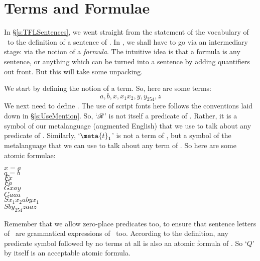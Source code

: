 \section{Terms and Formulae}\label{s:termsandf}
In §\ref{s:TFLSentences}, we went straight from the statement of the vocabulary of \TFL\ to the definition of a sentence of \TFL. In \FOL, we shall have to go via an intermediary stage: via the notion of a  \emph{formula}. The intuitive idea is that a formula is any sentence, or anything which can be turned into a sentence by adding quantifiers out front. But this will take some unpacking.

We start by defining the notion of a term.
So, here are some terms:
	$$a, b, x, x_{1} x_{2}, y, y_{254}, z$$
We next need to define .
The use of script fonts here follows the conventions laid down in §\ref{s:UseMention}. So, `$\mathscr{R}$' is not itself a predicate of \FOL. Rather, it is a symbol of our metalanguage (augmented English) that we use to talk about any predicate of \FOL. Similarly, `$\meta{t}_{1}$' is not a term of \FOL, but a symbol of the metalanguage that we can use to talk about any term of \FOL. So here are some atomic formulae:
	\begin{center}
		$x = a$\\
		$a = b$\\
		$Fx$\\
		$Fa$\\
		$Gxay$\\
		$Gaaa$\\
		$Sx_{1} x_{2} a b y x_{1}$\\
		$Sby_{254} z a a z$\\
	\end{center}
Remember that we allow zero-place predicates too, to ensure that sentence letters of \TFL\ are grammatical expressions of \FOL\ too. According to the definition, any predicate symbol followed by no terms at all is also an atomic formula of \FOL. So `$Q$' by itself is an acceptable atomic formula.


